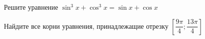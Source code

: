 \begin{ex}
	\begin{condition}
		\begin{enumcols}[label=\asbuk*)]
			\item Решите уравнение \( \sin^3 x +\cos^3 x = \sin x + \cos x \)
			\item Найдите все корни уравнения, принадлежащие отрезку \( \left[\dfrac{9\pi}{4};\dfrac{13\pi}{4}\right] \)
		\end{enumcols}
	\end{condition}
\end{ex}